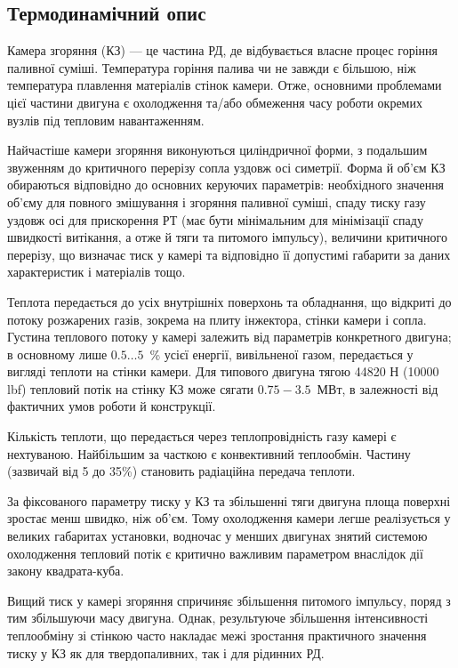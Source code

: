 \subsection{Термодинамічний опис}

Камера згоряння (КЗ) --- це частина РД, де відбувається власне процес горіння паливної суміші. Температура горіння палива чи не завжди є більшою, ніж температура плавлення матеріалів стінок камери. Отже, основними проблемами цієї частини двигуна є охолодження та/або обмеження часу роботи окремих вузлів під тепловим навантаженням.

Найчастіше камери згоряння виконуються циліндричної форми, з подальшим звуженням до критичного перерізу сопла уздовж осі симетрії. Форма й об'єм КЗ обираються відповідно до основних керуючих параметрів: необхідного значення об'єму для повного змішування і згоряння паливної суміші, спаду тиску газу уздовж осі для прискорення РТ (має бути мінімальним для мінімізації спаду швидкості витікання, а отже й тяги та питомого імпульсу), величини критичного перерізу, що визначає тиск у камері та відповідно її допустимі габарити за даних характеристик і матеріалів тощо.

Теплота передається до усіх внутрішніх поверхонь та обладнання, що відкриті до потоку розжарених газів, зокрема на плиту інжектора, стінки камери і сопла. Густина теплового потоку у камері залежить від параметрів конкретного двигуна; в основному лише  $0.5\ldots 5$~\% усієї енергії, вивільненої газом, передається у вигляді теплоти на стінки камери. Для типового двигуна тягою 44820 Н (10000 lbf) тепловий потік на стінку КЗ може сягати $0.75 -  3.5$~МВт, в залежності від фактичних умов роботи  й конструкції.

Кількість теплоти, що передається через теплопровідність газу камері є нехтуваною. Найбільшим за часткою є конвективний теплообмін. Частину (зазвичай від 5 до 35\%) становить радіаційна передача теплоти.

За фіксованого параметру тиску у КЗ та збільшенні тяги двигуна площа поверхні зростає менш швидко, ніж об'єм. Тому охолодження камери легше реалізується у великих габаритах установки, водночас у менших двигунах знятий системою охолодження тепловий потік є критично важливим параметром внаслідок дії закону квадрата-куба.

Вищий тиск у камері згоряння спричиняє збільшення питомого імпульсу, поряд з тим збільшуючи масу двигуна. Однак, результуюче збільшення інтенсивності теплообміну зі стінкою часто накладає межі зростання практичного значення тиску у КЗ як для твердопаливних, так і для рідинних РД.

